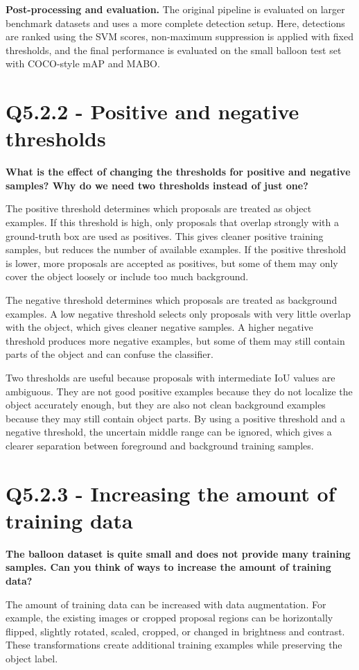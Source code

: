 \documentclass[11pt,a4paper]{article}
\begin{document}
\textbf{Post-processing and evaluation.} The original pipeline is evaluated on larger benchmark datasets and uses a more complete detection setup. Here, detections are ranked using the SVM scores, non-maximum suppression is applied with fixed thresholds, and the final performance is evaluated on the small balloon test set with COCO-style mAP and MABO.

\section*{Q5.2.2 - Positive and negative thresholds}
\textbf{What is the effect of changing the thresholds for positive and negative samples? Why do we need two thresholds instead of just one?}

The positive threshold determines which proposals are treated as object examples. If this threshold is high, only proposals that overlap strongly with a ground-truth box are used as positives. This gives cleaner positive training samples, but reduces the number of available examples. If the positive threshold is lower, more proposals are accepted as positives, but some of them may only cover the object loosely or include too much background.

The negative threshold determines which proposals are treated as background examples. A low negative threshold selects only proposals with very little overlap with the object, which gives cleaner negative samples. A higher negative threshold produces more negative examples, but some of them may still contain parts of the object and can confuse the classifier.

Two thresholds are useful because proposals with intermediate IoU values are ambiguous. They are not good positive examples because they do not localize the object accurately enough, but they are also not clean background examples because they may still contain object parts. By using a positive threshold and a negative threshold, the uncertain middle range can be ignored, which gives a clearer separation between foreground and background training samples.

\section*{Q5.2.3 - Increasing the amount of training data}
\textbf{The balloon dataset is quite small and does not provide many training samples. Can you think of ways to increase the amount of training data?}

The amount of training data can be increased with data augmentation. For example, the existing images or cropped proposal regions can be horizontally flipped, slightly rotated, scaled, cropped, or changed in brightness and contrast. These transformations create additional training examples while preserving the object label.
\end{document}
